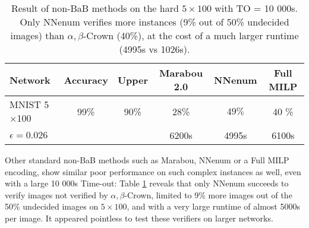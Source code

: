 \begin{table}[t!]
	\centering
	\begin{tabular}{||l|c|c||c|c|c||}
		\hline
		Network &  Accuracy & Upper  & Marabou 2.0 & NNenum &  Full MILP  \\ \hline
		MNIST 5$\times$100 & 99\% & 90\% & 28\% & $49\%$ & 40 \%    \\
		$\epsilon = 0.026$ & &  &6200s &  4995s & 6100s
		  \\  \hline
	\end{tabular}
\caption{Result of non-BaB methods on the hard $5 \times 100$ with TO = 10 000s. 
Only NNenum verifies more instances (9\% out of 50\% undecided images) than $\alpha,\beta$-Crown (40\%), at the cost of a much larger runtime (4995s vs 1026s).
\vspace{-0.5cm}}
\label{table_complete}
\end{table}

Other standard non-BaB methods such as Marabou, NNenum or a Full MILP encoding, show similar poor performance on such complex instances as well, even with a large 10 000s Time-out: Table \ref{table_complete} reveals that only NNenum succeeds to verify images not verified by $\alpha,\beta$-Crown, limited to 9\% more images out of the 50\% undecided images on $5 \times 100$, and with a very large runtime of almost 5000s per image. It appeared pointless to test these verifiers on larger networks.









